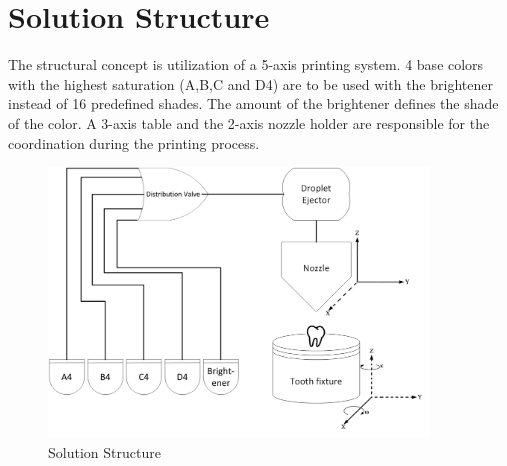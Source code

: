 \chapter{Solution Structure}
The structural concept is utilization of a 5-axis printing system. 4 base colors with the highest saturation (A,B,C and D4) are to be used with the brightener instead of 16 predefined shades. The amount of the brightener defines the shade of the color. A 3-axis table and the 2-axis nozzle holder are responsible for the coordination during the printing process.
\newline
\begin{figure}[h]
	\centering
	\includegraphics[width=0.9\textwidth]{grafiken/SolutionStructure.jpg}
	\caption{Solution Structure}
	\label{fig:SolutionStructure}
\end{figure} 

